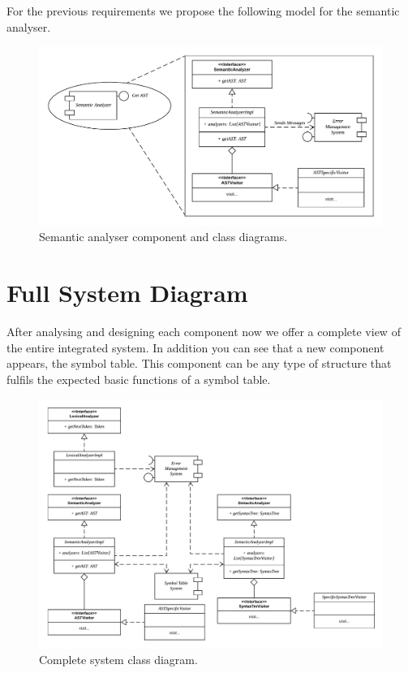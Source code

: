 For the previous requirements we propose the following model for the semantic analyser.

\begin{figure}[h!]
    \includegraphics[width=\textwidth]{images/sema-diagram.pdf}
    \centering
    \caption[Semantic analyser component and class diagrams]{Semantic analyser component and class diagrams.}
    \label{fig:sema-diag}
\end{figure}

\section{Full System Diagram}
After analysing and designing each component now we offer a
complete view of the entire integrated system. In addition
you can see that a new component appears, the symbol table.
This component can be any type of structure that fulfils the
expected basic functions of a symbol table.

\begin{figure}[h!]
    \includegraphics[scale=0.4]{images/full-diagram.pdf}
    \centering
    \caption[Complete system class diagram]{Complete system class diagram.}
    \label{fig:full-diag}
\end{figure}